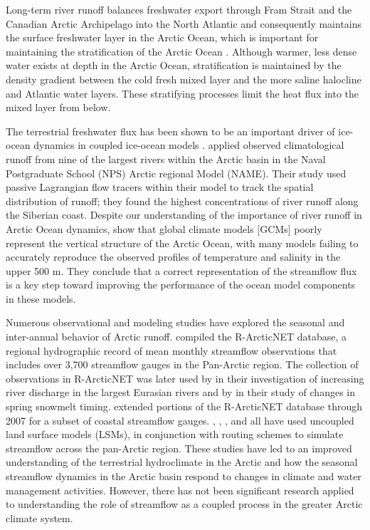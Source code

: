 \documentclass[jgrga, draft]{agutex}
\begin{document}
\begin{article}
Long-term river runoff balances freshwater export through Fram Strait and the Canadian Arctic Archipelago into the North Atlantic and consequently maintains the surface freshwater layer in the Arctic Ocean, which is important for maintaining the stratification of the Arctic Ocean \citep{Nummelin_2015}.
Although warmer, less dense water exists at depth in the Arctic Ocean, stratification is maintained by the density gradient between the cold fresh mixed layer and the more saline halocline and Atlantic water layers.
These stratifying processes limit the heat flux into the mixed layer from below.

The terrestrial freshwater flux has been shown to be an important driver of ice-ocean dynamics in coupled ice-ocean models \citep[e.g.][]{Morison_2012,Lique_2015}.
\citet{Newton_2008} applied observed climatological runoff from nine of the largest rivers within the Arctic basin in the Naval Postgraduate School (NPS) Arctic regional Model (NAME).
Their study used passive Lagrangian flow tracers within their model to track the spatial distribution of runoff; they found the highest concentrations of river runoff along the Siberian coast.
Despite our understanding of the importance of river runoff in Arctic Ocean dynamics, \citet{Nummelin_2015} show that global climate models [GCMs] poorly represent the vertical structure of the Arctic Ocean, with many models failing to accurately reproduce the observed profiles of temperature and salinity in the upper 500 m.
They conclude that a correct representation of the streamflow flux is a key step toward improving the performance of the ocean model components in these models.

Numerous observational and modeling studies have explored the seasonal and inter-annual behavior of Arctic runoff.
\citet{Lammers_2001} compiled the R-ArcticNET database, a regional hydrographic record of mean monthly streamflow observations that includes over 3,700 streamflow gauges in the Pan-Arctic region.
The collection of observations in R-ArcticNET was later used by \citet{Shiklomanov_2009} in their investigation of increasing river discharge in the largest Eurasian rivers and by \citet{Tan_2011} in their study of changes in spring snowmelt timing.
\citet{Dai_2009} extended portions of the R-ArcticNET database through 2007 for a subset of coastal streamflow gauges.
\citet{Adam_2007}, \citet{Adam_2008}, \citet{Su_2005}, and \citet{Dai_2009} all have used uncoupled land surface models (LSMs), in conjunction with routing schemes to simulate streamflow across the pan-Arctic region.
These studies have led to an improved understanding of the terrestrial hydroclimate in the Arctic and how the seasonal streamflow dynamics in the Arctic basin respond to changes in climate and water management activities.
However, there has not been significant research applied to understanding the role of streamflow as a coupled process in the greater Arctic climate system.


\end{article}
\end{document}
